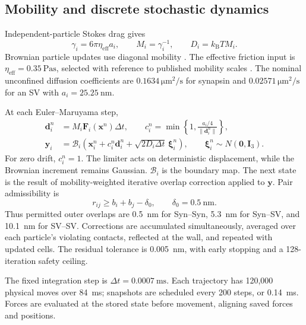 \documentclass[11pt,letterpaper]{article}
\newcommand{\kBT}{k_{\mathrm B}T}
\begin{document}
\subsection{Mobility and discrete stochastic dynamics}
Independent-particle Stokes drag gives
\begin{equation}
 \gamma_i=6\pi\eta_{\mathrm{eff}}a_i,\qquad
 M_i=\gamma_i^{-1},\qquad D_i=\kBT M_i .
 \label{eq:mobility}
\end{equation}
Brownian particle updates use diagonal mobility
\cite{Ermak1978}.
The effective friction input is
\(\eta_{\mathrm{eff}}=\SI{0.35}{\pascal\second}\), selected with reference to
published mobility scales \cite{Hoffmann2023,Rothman2016}.
The nominal unconfined diffusion coefficients are
\(0.1634\,\si{\micro\metre\squared\per\second}\) for synapsin and
\(0.02571\,\si{\micro\metre\squared\per\second}\) for an SV with
\(a_i=\SI{25.25}{\nano\metre}\).

At each Euler--Maruyama step,
\begin{align}
 \bm d_i^n&=M_i\bm F_i(\bm x^n)\Delta t,\qquad
 c_i^n=\min\left\{1,\frac{a_i/4}{\lVert\bm d_i^n\rVert}\right\},\\
 \bm y_i&=\mathcal B_i\left(
       \bm x_i^n+c_i^n\bm d_i^n+
       \sqrt{2D_i\Delta t}\,\bm\xi_i^n\right),\qquad
 \bm\xi_i^n\sim N(\bm0,\bm I_3).
 \label{eq:proposal}
\end{align}
For zero drift, \(c_i^n=1\). The limiter acts on deterministic
displacement, while the Brownian increment remains Gaussian.
\(\mathcal B_i\) is the boundary map.
The next state is the result of mobility-weighted iterative overlap
correction applied to \(\bm y\). Pair admissibility is
\begin{equation}
 r_{ij}\geq b_i+b_j-\delta_0,\qquad
 \delta_0=\SI{0.5}{\nano\metre}.
 \label{eq:admissible}
\end{equation}
Thus permitted outer overlaps are \SI{0.5}{\nano\metre} for Syn--Syn,
\SI{5.3}{\nano\metre} for Syn--SV, and \SI{10.1}{\nano\metre} for SV--SV.
Corrections are accumulated simultaneously, averaged over each particle's
violating contacts, reflected at the wall, and repeated with updated cells.
The residual tolerance is \SI{0.005}{\nano\metre}, with early stopping and a
128-iteration safety ceiling.

The fixed integration step is \(\Delta t=\SI{0.0007}{\milli\second}\).
Each trajectory has 120,000 physical moves over \SI{84}{\milli\second};
snapshots are scheduled every 200 steps, or \SI{0.14}{\milli\second}.
Forces are evaluated at the stored state before movement, aligning saved
forces and positions.
\end{document}
